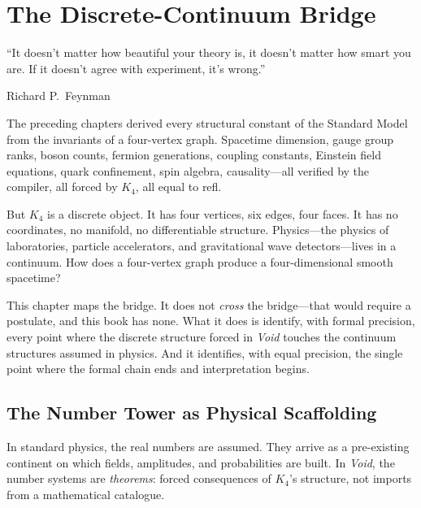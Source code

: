 \documentclass[11pt,a4paper]{book}
\def\texttt#1{#1}%
\begin{document}
\chapter{The Discrete-Continuum Bridge}
\label{ch:discrete-continuum-bridge}

\epigraph{``It doesn't matter how beautiful your theory is, it doesn't matter how smart you are. If it doesn't agree with experiment, it's wrong.''}{Richard P.~Feynman}

The preceding chapters derived every structural constant of the Standard Model from the invariants of a four-vertex graph. Spacetime dimension, gauge group ranks, boson counts, fermion generations, coupling constants, Einstein field equations, quark confinement, spin algebra, causality---all verified by the compiler, all forced by $K_4$, all equal to \texttt{refl}.

But $K_4$ is a discrete object. It has four vertices, six edges, four faces. It has no coordinates, no manifold, no differentiable structure. Physics---the physics of laboratories, particle accelerators, and gravitational wave detectors---lives in a continuum. How does a four-vertex graph produce a four-dimensional smooth spacetime?

This chapter maps the bridge. It does not \emph{cross} the bridge---that would require a postulate, and this book has none. What it does is identify, with formal precision, every point where the discrete structure forced in \textit{Void} touches the continuum structures assumed in physics. And it identifies, with equal precision, the single point where the formal chain ends and interpretation begins.


\section{The Number Tower as Physical Scaffolding}
\label{sec:number-tower-physics}

In standard physics, the real numbers are assumed. They arrive as a pre-existing continent on which fields, amplitudes, and probabilities are built. In \textit{Void}, the number systems are \emph{theorems}: forced consequences of $K_4$'s structure, not imports from a mathematical catalogue.
\end{document}
